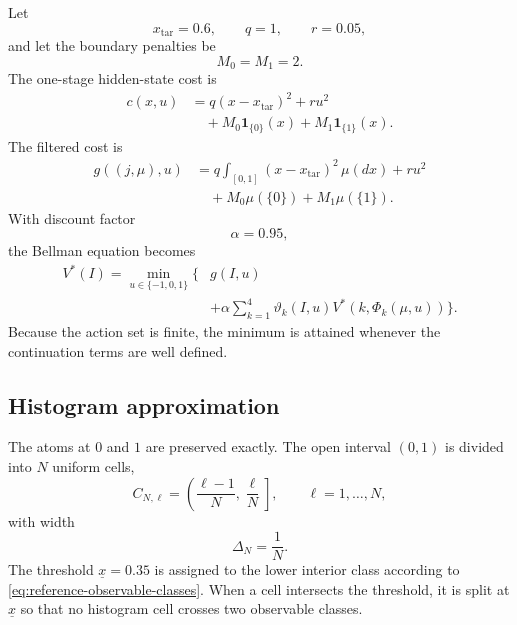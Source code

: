 \documentclass[10pt,twocolumn]{article}
\theoremstyle{remark}
\newcommand{\one}{\mathbf{1}}
\begin{document}
Let
\begin{equation*}
	x_{\mathrm{tar}}=0.6,
	\qquad
	q=1,
	\qquad
	r=0.05,
	\label{eq:reference-cost-parameters}
\end{equation*}
and let the boundary penalties be
\begin{equation*}
	M_0=M_1=2.
	\label{eq:reference-boundary-penalties}
\end{equation*}
The one-stage hidden-state cost is
\begin{equation}
	\begin{aligned}
		c(x,u)
		&=
		q(x-x_{\mathrm{tar}})^2
		+
		ru^2
		\\
		&\quad+
		M_0\one_{\{0\}}(x)
		+
		M_1\one_{\{1\}}(x).
	\end{aligned}
	\label{eq:reference-stage-cost}
\end{equation}
The filtered cost is
\begin{equation*}
	\begin{aligned}
		g((j,\mu),u)
		&=
		q\int_{[0,1]}
		(x-x_{\mathrm{tar}})^2\,\mu(dx)
		+
		ru^2
		\\
		&\quad+
		M_0\mu(\{0\})
		+
		M_1\mu(\{1\}).
	\end{aligned}
	\label{eq:reference-filtered-cost}
\end{equation*}
With discount factor
\begin{equation*}
	\alpha=0.95,
	\label{eq:reference-discount-factor}
\end{equation*}
the Bellman equation becomes
\begin{equation}
	\begin{aligned}
		V^*(I)
		=
		\min_{u\in\{-1,0,1\}}
		\Bigg\{
		&g(I,u)
		\\
		&+
		\alpha
		\sum_{k=1}^{4}
		\vartheta_k(I,u)
		V^*\!\left(
		k,\Phi_k(\mu,u)
		\right)
		\Bigg\}.
	\end{aligned}
	\label{eq:reference-bellman}
\end{equation}
Because the action set is finite, the minimum is attained whenever the continuation terms are well defined.

\subsection{Histogram approximation}
\label{subsec:reference-histogram-approximation}

The atoms at \(0\) and \(1\) are preserved exactly. The open interval \((0,1)\) is divided into \(N\) uniform cells,
\begin{equation*}
	C_{N,\ell}
	=
	\left(
	\frac{\ell-1}{N},
	\frac{\ell}{N}
	\right],
	\qquad
	\ell=1,\ldots,N,
	\label{eq:reference-uniform-cells}
\end{equation*}
with width
\[
\Delta_N=\frac1N.
\]
The threshold \(\underline x=0.35\) is assigned to the lower interior class according to
\cref{eq:reference-observable-classes}. When a cell intersects the threshold, it is split at \(\underline x\) so that no histogram cell crosses two observable classes.
\end{document}
